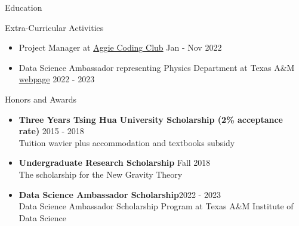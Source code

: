 \documentclass{resume}
\begin{document}
\begin{rSection}{Education}
\begin{rSection}{Extra-Curricular Activities}
\begin{itemize}
    \item Project Manager at \href{https://aggiecodingclub.com/}{Aggie Coding Club} \hfill Jan - Nov 2022
    \item Data Science Ambassador representing Physics Department at Texas A\&M \href{https://noctildon.github.io/programming/DS_ambassador/index.html}{webpage} \hfill 2022 - 2023
\end{itemize}
\end{rSection}


\begin{rSection}{Honors and Awards}
    \begin{itemize}
        \item \textbf{Three Years Tsing Hua University Scholarship (2\% acceptance rate)} \hfill 2015 - 2018 \\
        Tuition wavier plus accommodation and textbooks subsidy
        \item \textbf{Undergraduate Research Scholarship} \hfill Fall 2018 \\
        The scholarship for the New Gravity Theory
        \item \textbf{Data Science Ambassador Scholarship}\hfill 2022 - 2023\\
        Data Science Ambassador Scholarship Program at Texas A\&M Institute of Data Science
    \end{itemize}
\end{rSection}

\end{rSection}
\end{document}
